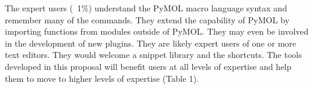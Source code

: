 The expert users (~1\%) understand the PyMOL macro language syntax and remember many of the commands. 
They extend the capability of PyMOL by importing functions from modules outside of PyMOL.
They may even be involved in the development of new plugins. 
They are likely expert users of one or more text editors. 
They would welcome a snippet library and the shortcuts. 
The tools developed in this proposal will benefit users at all levels of expertise and help them to move to higher levels of expertise (Table 1).



